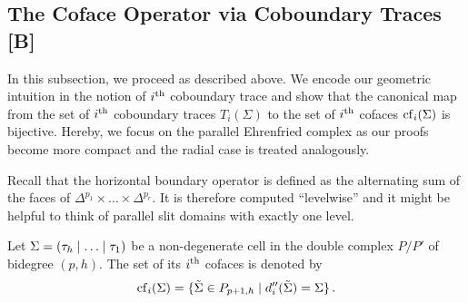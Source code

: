\subsection{The Coface Operator via Coboundary Traces [B]}
In this subsection, we proceed as described above.
We encode our geometric intuition in the notion of $i^{\text{th}}$ coboundary trace and show
that the canonical map from the set of $i^{\text{th}}$ coboundary traces $T_i(\Sigma)$ to the set of $i^{\text{th}}$ cofaces $\operatorname{cf}_i(\Sigma)$ is bijective.
Hereby, we focus on the parallel Ehrenfried complex as our proofs become more compact and the radial case is treated analogously.

Recall that the horizontal boundary operator is defined as the alternating sum of the faces of $\Delta^{p_1} \times \ldots \times \Delta^{p_r}$.
It is therefore computed ``levelwise'' and it might be helpful to think of parallel slit domains with exactly one level.

\begin{defi}
    \label{cellular_models:dual_ehrenfried:cofaces}
    Let $\Sigma = \inhom$ be a non-degenerate cell in the double complex $P/P'$ of bidegree $(p,h)$.
    The set of its $i^{\text{th}}$ cofaces is denoted by
    \[
        \operatorname{cf}_i(\Sigma) = \{ \tilde\Sigma \in P_{p+1, h} \mid d_i''(\tilde\Sigma) = \Sigma \} \,.
    \]
\end{defi}


